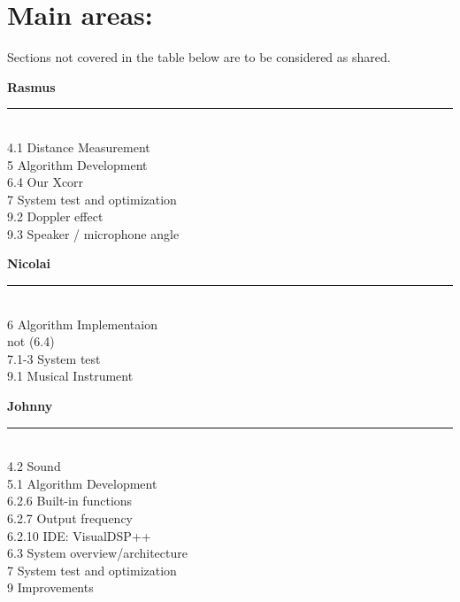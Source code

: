 \section{Main areas:}
Sections not covered in the table below are to be considered as shared.\\
\begin{minipage}{0.31\columnwidth}
\begin{center}
\textbf{Rasmus}
\end{center}
\hrule
\ \\
4.1 Distance Measurement\\
5 Algorithm Development\\
6.4 Our Xcorr\\
7 System test and optimization\\
9.2 Doppler effect\\
9.3 Speaker / microphone angle\\
\end{minipage}
\hfill
\vline
\hfill
\begin{minipage}{0.31\columnwidth}
\begin{center}
\textbf{Nicolai}
\end{center}
\hrule
\ \\
6 Algorithm Implementaion\\
 not (6.4)\\
7.1-3 System test\\
9.1 Musical Instrument\\
\end{minipage}
\hfill
\vline
\hfill
\begin{minipage}{0.31\columnwidth}
\begin{center}
\textbf{Johnny}
\end{center}
\hrule
\ \\
4.2 Sound\\
5.1 Algorithm Development\\
6.2.6 Built-in functions\\
6.2.7 Output frequency\\
6.2.10 IDE: VisualDSP++\\
6.3 System overview/architecture\\
7 System test and optimization\\
9 Improvements\\
\end{minipage}